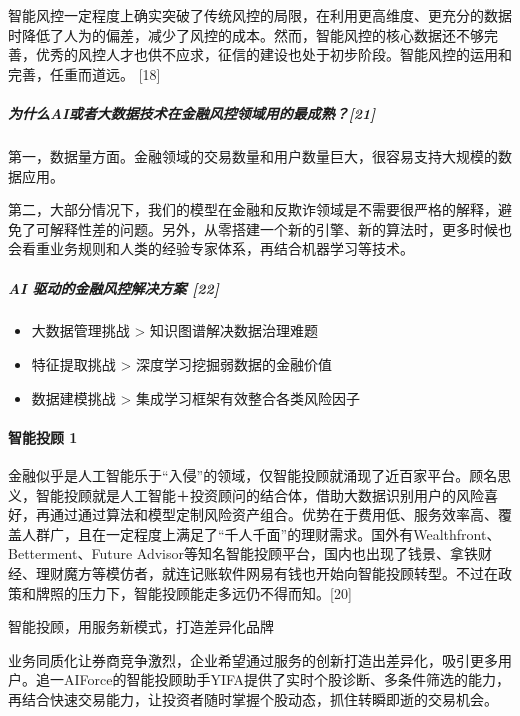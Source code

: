 \documentclass[letterpaper,11pt,english]{sphinxmanual}
\begin{document}
智能风控一定程度上确实突破了传统风控的局限，在利用更高维度、更充分的数据时降低了人为的偏差，减少了风控的成本。然而，智能风控的核心数据还不够完善，优秀的风控人才也供不应求，征信的建设也处于初步阶段。智能风控的运用和完善，任重而道远。
{[}18{]}


\subparagraph{为什么AI或者大数据技术在金融风控领域用的最成熟？{[}21{]}}
\label{\detokenize{chapter_project/AI_Finance:ai-21}}
第一，数据量方面。金融领域的交易数量和用户数量巨大，很容易支持大规模的数据应用。

第二，大部分情况下，我们的模型在金融和反欺诈领域是不需要很严格的解释，避免了可解释性差的问题。另外，从零搭建一个新的引擎、新的算法时，更多时候也会看重业务规则和人类的经验专家体系，再结合机器学习等技术。


\subparagraph{AI 驱动的金融风控解决方案 {[}22{]}}
\label{\detokenize{chapter_project/AI_Finance:ai-22}}\begin{itemize}
\item {} 
大数据管理挑战 \sphinxhyphen{}> 知识图谱解决数据治理难题

\item {} 
特征提取挑战 \sphinxhyphen{}> 深度学习挖掘弱数据的金融价值

\item {} 
数据建模挑战 \sphinxhyphen{}> 集成学习框架有效整合各类风险因子

\end{itemize}


\paragraph{智能投顾 1\sphinxfootnotemark[681]}
\label{\detokenize{chapter_project/AI_Finance:id12}}%
\begin{footnotetext}[681]\sphinxAtStartFootnote
{}
%
\end{footnotetext}\ignorespaces 
金融似乎是人工智能乐于“入侵”的领域，仅智能投顾就涌现了近百家平台。顾名思义，智能投顾就是人工智能＋投资顾问的结合体，借助大数据识别用户的风险喜好，再通过通过算法和模型定制风险资产组合。优势在于费用低、服务效率高、覆盖人群广，且在一定程度上满足了“千人千面”的理财需求。国外有Wealthfront、Betterment、Future
Advisor等知名智能投顾平台，国内也出现了钱景、拿铁财经、理财魔方等模仿者，就连记账软件网易有钱也开始向智能投顾转型。不过在政策和牌照的压力下，智能投顾能走多远仍不得而知。{[}20{]}

智能投顾，用服务新模式，打造差异化品牌

业务同质化让券商竞争激烈，企业希望通过服务的创新打造出差异化，吸引更多用户。追一AIForce的智能投顾助手YIFA提供了实时个股诊断、多条件筛选的能力，再结合快速交易能力，让投资者随时掌握个股动态，抓住转瞬即逝的交易机会。
\end{document}
